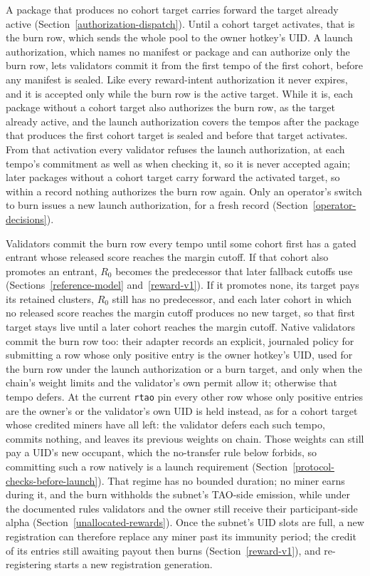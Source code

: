 A package that produces no cohort target carries forward the target already
active (Section~\ref{authorization-dispatch}). Until a cohort target activates,
that is the burn row, which sends the whole pool to the owner hotkey's UID. A
launch authorization, which names no manifest or package and can authorize only
the burn row, lets validators commit it from the first tempo of the first
cohort, before any manifest is sealed. Like every reward-intent authorization it
never expires, and it is accepted only while the burn row is the active target. While
it is, each package without a cohort target also authorizes the burn row, as the target already active, and
the launch authorization covers the tempos after the package that produces the
first cohort target is sealed and before that target activates. From that
activation every validator refuses the launch authorization, at each tempo's
commitment as well as when checking it, so it is never accepted again; later
packages without a cohort target carry forward the activated target, so within
a record nothing authorizes the burn row again. Only an operator's switch to
burn issues a new launch authorization, for a fresh record
(Section~\ref{operator-decisions}).

Validators commit the burn row every tempo until
some cohort first has a gated entrant whose released score reaches the margin
cutoff. If that cohort also promotes an entrant, \(R_0\) becomes the
predecessor that later fallback cutoffs use (Sections~\ref{reference-model}
and~\ref{reward-v1}). If it promotes none, its target pays its retained
clusters, \(R_0\) still has no predecessor, and each later cohort in which no
released score reaches the margin cutoff produces no new target, so that first
target stays live until a later cohort reaches the margin cutoff. Native
validators commit the burn row too: their adapter records an explicit,
journaled policy for submitting a row whose only positive entry is the owner
hotkey's UID, used for the burn row under the launch authorization or a burn
target, and only when the chain's weight limits and the validator's own permit
allow it; otherwise that tempo defers. At the current \texttt{rtao} pin every
other row whose only positive entries are the owner's or the validator's own UID
is held instead, as for a cohort target whose credited miners have all left:
the validator defers each such tempo, commits nothing, and leaves its previous
weights on chain. Those weights can still pay a UID's new occupant, which the
no-transfer rule below forbids, so committing such a row natively is a launch
requirement (Section~\ref{protocol-checks-before-launch}).
That regime has no bounded duration; no miner earns
during it, and the burn withholds the subnet's TAO-side emission, while under
the documented rules validators and the owner still receive their
participant-side alpha (Section~\ref{unallocated-rewards}). Once the subnet's UID slots are full, a new registration can therefore replace any miner past its
immunity period; the credit of its entries still awaiting payout then burns
(Section~\ref{reward-v1}), and re-registering starts a new registration
generation.


